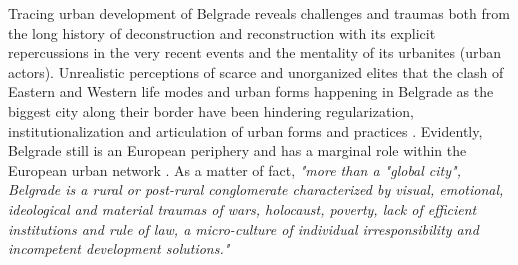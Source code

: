 \documentclass[11pt]{report}
\begin{document}
Tracing  urban  development  of  Belgrade  reveals  challenges  and  traumas both from the long history of deconstruction and reconstruction with its explicit repercussions in the very recent events and the mentality of its urbanites (urban actors).
Unrealistic perceptions of scarce and unorganized elites that the clash of Eastern and Western life modes and urban forms happening in Belgrade as the biggest city along their border have been hindering regularization, institutionalization and articulation of urban forms and practices \cite{other ref Samardzic in Doytchinov 2015}. Evidently, Belgrade still is an European periphery and has a marginal role within the European urban network \cite{Vujovic and Petrovic 2007}. 
As a matter of fact, \textit{"more  than  a  "global  city",  Belgrade  is  a  rural  or  post-rural  conglomerate characterized by visual, emotional, ideological and material traumas of wars, holocaust, poverty, lack of efficient institutions and rule of law, a micro-culture of  individual  irresponsibility  and  incompetent  development  solutions."} \cite{Samardzic in Doytchinov 2015} 
\\
\end{document}
